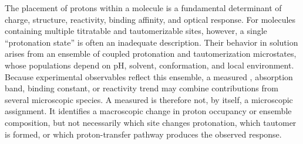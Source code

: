 The placement of protons within a molecule is a fundamental determinant of charge, structure, reactivity, binding affinity, and optical response.\cite{manallackPKaDistributionDrugs2007,martinLetsNotForget2009,baxGettingChemistryRight2017,maBiomedicalApplicationsSupramolecular2015,muruganRoleProtonationState2014,handeRecentAdvancesSmall2022}
For molecules containing multiple titratable and tautomerizable sites, however, a single ``protonation state'' is often an inadequate description.
Their behavior in solution arises from an ensemble of coupled protonation and tautomerization microstates, whose populations depend on pH, solvent, conformation, and local environment.\cite{gunnerStandardStateFree2020,isikOverviewSAMPL6PKa2021,nagyTheoreticalCalculationsConformational2014}
Because experimental observables reflect this ensemble, a measured \pka{}, absorption band, binding constant, or reactivity trend may combine contributions from several microscopic species.
A measured \pka{} is therefore not, by itself, a microscopic assignment.
It identifies a macroscopic change in proton occupancy or ensemble composition, but not necessarily which site changes protonation, which tautomer is formed, or which proton-transfer pathway produces the observed response.\cite{ullmannRelationsProtonationConstants2003,bombardaPHDependentPKaValues2010}

